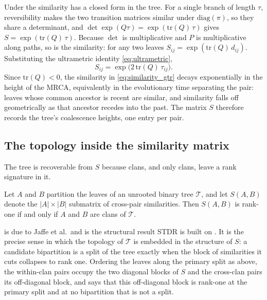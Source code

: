 Under  the similarity has a closed form in the tree. For a single
branch of length $\tau$, reversibility makes the two transition matrices similar
under $\mathrm{diag}(\pi)$, so they share a determinant, and
$\det\exp(Q\tau) = \exp(\mathrm{tr}(Q)\,\tau)$ gives
$S = \exp(\mathrm{tr}(Q)\,\tau)$. Because $\det$ is multiplicative and $P$ is
multiplicative along paths, so is the similarity: for any two leaves
$S_{ij} = \exp(\mathrm{tr}(Q)\,d_{ij})$. Substituting the ultrametric identity
\eqref{eq:ultrametric},
\begin{equation}\label{eq:similarity_gtr}
    S_{ij} = \exp\!\bigl(2\,\mathrm{tr}(Q)\,\tau_{ij}\bigr).
\end{equation}
Since $\mathrm{tr}(Q)<0$, the similarity in \eqref{eq:similarity_gtr} decays
exponentially in the height of the MRCA, equivalently in the evolutionary time
separating the pair: leaves whose common ancestor is recent are similar, and
similarity falls off geometrically as that ancestor recedes into the past. The
matrix $S$ therefore records the tree's coalescence heights, one entry per pair.


\subsection{The topology inside the similarity matrix}\label{sec:model-blocks}

The tree is recoverable from $S$ because clans, and only clans, leave a rank
signature in it.

\begin{lemma}\label{lem:rank-one}
Let $A$ and $B$ partition the leaves of an unrooted binary tree $\mathcal{T}$, and
let $S(A,B)$ denote the $|A| \times |B|$ submatrix of cross-pair similarities. Then
$S(A,B)$ is rank-one if and only if $A$ and $B$ are clans of $\mathcal{T}$.
\end{lemma}

\noindent {} is due to Jaffe et al.\ and is the structural result
STDR is built on \cite{jaffe2021spectral, aizenbud2023spectral}. It is the precise
sense in which the topology of
$\mathcal{T}$ is embedded in the structure of $S$: a candidate bipartition is a
split of the tree exactly when the block of similarities it cuts collapses to rank
one. Ordering the leaves along the primary split as above, the within-clan pairs
occupy the two diagonal blocks of $S$ and the cross-clan pairs its off-diagonal
block, and  says that this off-diagonal block is rank-one at the
primary split and at no bipartition that is not a split.

